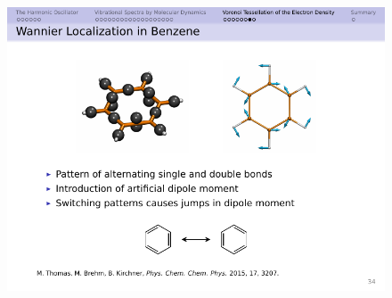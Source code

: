 \documentclass[t]{beamer}
\begin{document}
\begin{frame}
\begin{columns}
        \begin{figure}
            \includegraphics[width=.6\textwidth]{figures/benzene_mesomerie.pdf}
        \end{figure}
        \end{columns}
	\end{frame}
\end{document}
